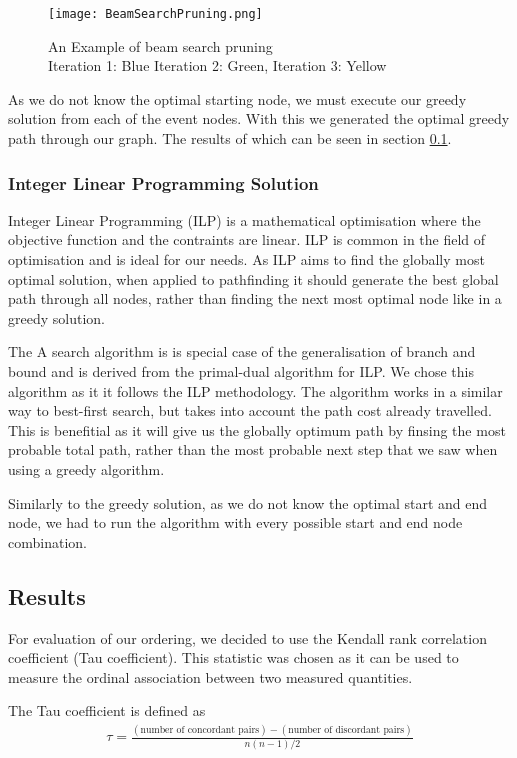 \documentclass[bsc,frontabs,twoside,singlespacing,parskip,deptreport]{infthesis}     %
\begin{document}
\begin{figure}
  \texttt{[image: BeamSearchPruning.png]}
  \caption{An Example of beam search pruning\\ Iteration 1: Blue Iteration 2: Green, Iteration 3: Yellow}
  \label{fig:beam-prune}
\end{figure}

As we do not know the optimal starting node, we must execute our greedy solution from each of the event nodes.
With this we generated the optimal greedy path through our graph. The results of which can be seen in section \ref{sec:graph-results}.

\subsubsection{Integer Linear Programming Solution}
Integer Linear Programming (ILP) is a mathematical optimisation where the objective function and the contraints are linear.
ILP is common in the field of optimisation and is ideal for our needs. As ILP aims to find the globally most optimal solution, when applied to pathfinding it
should generate the best global path through all nodes, rather than finding the next most optimal node like in a greedy solution.


The A\* search algorithm is is special case of the generalisation of branch and bound\cite{balas1983branch} and is derived from the primal-dual algorithm for ILP\cite{ye2012note}.
We chose this algorithm as it it follows the ILP methodology. The algorithm works in a similar way to best-first search, but takes into account the path cost already travelled.
This is benefitial as it will give us the globally optimum path by finsing the most probable total path, rather than the most probable next step that we saw when using a
greedy algorithm.

Similarly to the greedy solution, as we do not know the optimal start and end node, we had to run the algorithm with every possible start and end node combination.

\subsection{Results}\label{sec:graph-results}
For evaluation of our ordering, we decided to use the Kendall rank correlation coefficient (Tau coefficient).
This statistic was chosen as it can be used to measure the ordinal association between two measured quantities.


The Tau coefficient is defined as
\begin{eqnarray}
  \tau=\frac{(\text{number of concordant pairs})-(\text{number of discordant pairs})}{n(n-1)/2}\nonumber
\end{eqnarray}\cite{abdi2007kendall}
\end{document}

